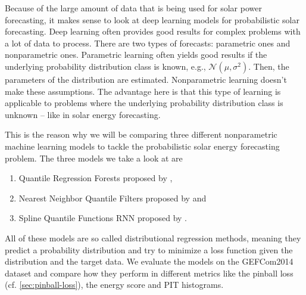 Because of the large amount of data that is being used for solar power forecasting, it makes sense to look at 
deep learning models for probabilistic solar forecasting. 
Deep learning often provides good results for complex problems with a lot of data to process. 
There are two types of forecasts: parametric ones and nonparametric ones. 
Parametric learning often yields good results if the underlying probability distribution class is known, e.g., \(\mathcal{N}(\mu, \sigma^2)\). 
Then, the parameters of the distribution are estimated. 
Nonparametric learning doesn't make these assumptions. 
The advantage here is that this type of learning is applicable to problems where the underlying 
probability distribution class is unknown -- like in solar energy forecasting. 



This is the reason why we will be comparing three different nonparametric machine learning models to tackle the probabilistic solar energy forecasting problem. 
The three models we take a look at are 
\begin{enumerate}
    \item Quantile Regression Forests proposed by \Textcite{Meinshausen2006},
    \item Nearest Neighbor Quantile Filters proposed by \Textcite{Ordiano2019} and
    \item Spline Quantile Functions RNN proposed by \Textcite{Gasthaus2019}.
\end{enumerate}
All of these models are so called distributional regression methods, meaning 
they predict a probability distribution and try to minimize a loss function 
given the distribution and the target data.
We evaluate the models on the GEFCom2014 dataset and compare how they perform 
in different metrics like the pinball loss (cf. \ref{sec:pinball-loss}), the energy score and PIT histograms. 
